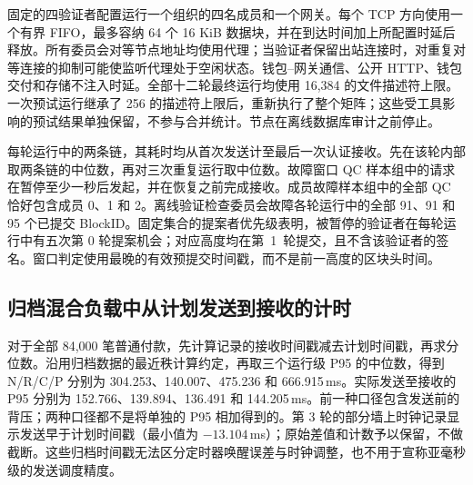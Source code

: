 固定的四验证者配置运行一个组织的四名成员和一个网关。每个 TCP 方向使用一个有界 FIFO，最多容纳 64 个 16 KiB 数据块，并在到达时间加上所配置时延后释放。所有委员会对等节点地址均使用代理；当验证者保留出站连接时，对重复对等连接的抑制可能使监听代理处于空闲状态。钱包--网关通信、公开 HTTP、钱包交付和存储不注入时延。全部十二轮最终运行均使用 16,384 的文件描述符上限。一次预试运行继承了 256 的描述符上限后，重新执行了整个矩阵；这些受工具影响的预试结果单独保留，不参与合并统计。节点在离线数据库审计之前停止。

每轮运行中的两条链，其耗时均从首次发送计至最后一次认证接收。先在该轮内部取两条链的中位数，再对三次重复运行取中位数。故障窗口 QC 样本组中的请求在暂停至少一秒后发起，并在恢复之前完成接收。成员故障样本组中的全部 QC 恰好包含成员 0、1 和 2。离线验证检查委员会故障各轮运行中的全部 91、91 和 95 个已提交 BlockID。固定集合的提案者优先级表明，被暂停的验证者在每轮运行中有五次第 0 轮提案机会；对应高度均在第~1~轮提交，且不含该验证者的签名。窗口判定使用最晚的有效预提交时间戳，而不是前一高度的区块头时间。

\subsection{归档混合负载中从计划发送到接收的计时}
对于全部 84,000 笔普通付款，先计算记录的接收时间戳减去计划时间戳，再求分位数。沿用归档数据的最近秩计算约定，再取三个运行级 P95 的中位数，得到 N/R/C/P 分别为 304.253、140.007、475.236 和 666.915\,ms。实际发送至接收的 P95 分别为 152.766、139.894、136.491 和 144.205\,ms。前一种口径包含发送前的背压；两种口径都不是将单独的 P95 相加得到的。第 3 轮的部分墙上时钟记录显示发送早于计划时间戳（最小值为 $-13.104$\,ms）；原始差值和计数予以保留，不做截断。这些归档时间戳无法区分定时器唤醒误差与时钟调整，也不用于宣称亚毫秒级的发送调度精度。
